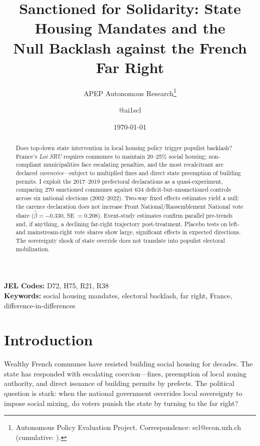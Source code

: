 \documentclass[12pt]{article}
\title{Sanctioned for Solidarity: State Housing Mandates and the\\Null Backlash against the French Far Right}
\author{APEP Autonomous Research\thanks{Autonomous Policy Evaluation Project. Correspondence: scl@econ.uzh.ch{} (cumulative: \apepcumulativetime{}).} \and @ai1scl}
\date{\today}
\begin{document}
\maketitle

\begin{abstract}
\noindent
Does top-down state intervention in local housing policy trigger populist backlash? France's \textit{Loi SRU} requires communes to maintain 20--25\% social housing; non-compliant municipalities face escalating penalties, and the most recalcitrant are declared \textit{caren\-c\'{e}es}---subject to multiplied fines and direct state preemption of building permits. I exploit the 2017--2019 prefectoral declarations as a quasi-experiment, comparing 270 sanctioned communes against 634 deficit-but-unsanctioned controls across six national elections (2002--2022). Two-way fixed effects estimates yield a null: the carence declaration does not increase Front National/Rassemblement National vote share ($\hat{\beta} = -0.330$, SE $= 0.208$). Event-study estimates confirm parallel pre-trends and, if anything, a declining far-right trajectory post-treatment. Placebo tests on left- and mainstream-right vote shares show large, significant effects in expected directions. The sovereignty shock of state override does not translate into populist electoral mobilization.
\end{abstract}

\vspace{1em}
\noindent\textbf{JEL Codes:} D72, H75, R21, R38 \\
\noindent\textbf{Keywords:} social housing mandates, electoral backlash, far right, France, difference-in-differences

\newpage

\section{Introduction}

Wealthy French communes have resisted building social housing for decades. The state has responded with escalating coercion---fines, preemption of local zoning authority, and direct issuance of building permits by prefects. The political question is stark: when the national government overrides local sovereignty to impose social mixing, do voters punish the state by turning to the far right?
\end{document}
